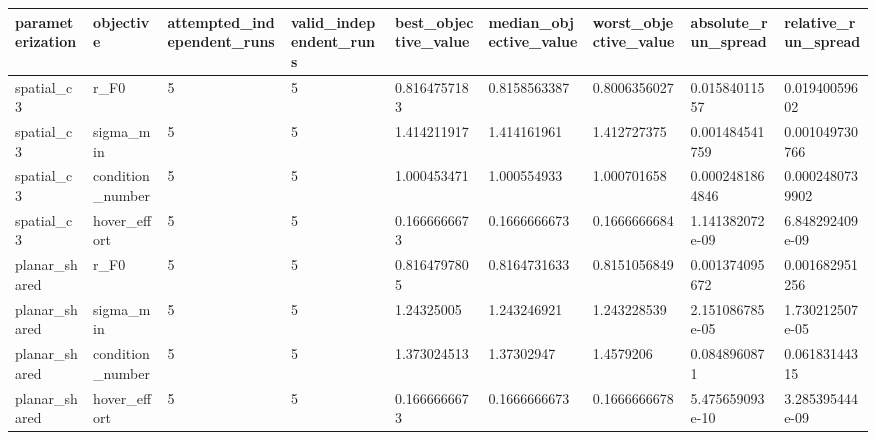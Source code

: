 \begin{tabular}{@{}lllllllll@{}}
\toprule
parameterization & objective & attempted\_independent\_runs & valid\_independent\_runs & best\_objective\_value & median\_objective\_value & worst\_objective\_value & absolute\_run\_spread & relative\_run\_spread \\
\midrule
spatial\_c3 & r\_F0 & 5 & 5 & 0.8164757183 & 0.8158563387 & 0.8006356027 & 0.01584011557 & 0.01940059602 \\
spatial\_c3 & sigma\_min & 5 & 5 & 1.414211917 & 1.414161961 & 1.412727375 & 0.001484541759 & 0.001049730766 \\
spatial\_c3 & condition\_number & 5 & 5 & 1.000453471 & 1.000554933 & 1.000701658 & 0.0002481864846 & 0.0002480739902 \\
spatial\_c3 & hover\_effort & 5 & 5 & 0.1666666673 & 0.1666666673 & 0.1666666684 & 1.141382072e-09 & 6.848292409e-09 \\
planar\_shared & r\_F0 & 5 & 5 & 0.8164797805 & 0.8164731633 & 0.8151056849 & 0.001374095672 & 0.001682951256 \\
planar\_shared & sigma\_min & 5 & 5 & 1.24325005 & 1.243246921 & 1.243228539 & 2.151086785e-05 & 1.730212507e-05 \\
planar\_shared & condition\_number & 5 & 5 & 1.373024513 & 1.37302947 & 1.4579206 & 0.0848960871 & 0.06183144315 \\
planar\_shared & hover\_effort & 5 & 5 & 0.1666666673 & 0.1666666673 & 0.1666666678 & 5.475659093e-10 & 3.285395444e-09 \\
\bottomrule
\end{tabular}
